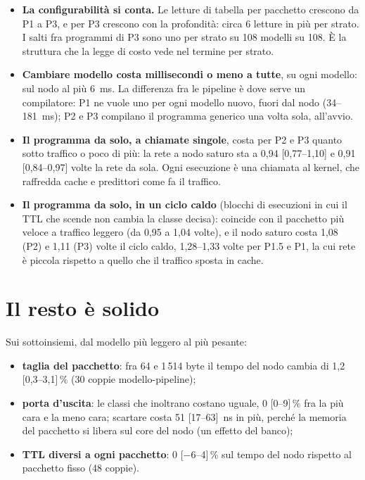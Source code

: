 \documentclass[11pt,a4paper,oneside]{report}
\begin{document}
\begin{itemize}
  \item \textbf{La configurabilità si conta.} Le letture di tabella per pacchetto
        crescono da P1 a P3, e per P3 crescono con la profondità: circa 6 letture
        in più per strato. I salti fra programmi di P3 sono uno per strato su 108
        modelli su 108. È la struttura che la legge di costo vede nel termine per
        strato.
  \item \textbf{Cambiare modello costa millisecondi o meno a tutte}, su ogni
        modello: sul nodo al più 6~ms. La differenza fra le pipeline è dove serve
        un compilatore: P1 ne vuole uno per ogni modello nuovo, fuori dal nodo
        (34--181~ms); P2 e P3 compilano il programma generico una volta sola,
        all'avvio.
  \item \textbf{Il programma da solo, a chiamate singole}, costa per P2 e P3 quanto
        sotto traffico o poco di più: la rete a nodo saturo sta a 0,94 [0,77--1,10]
        e 0,91 [0,84--0,97] volte la rete da sola. Ogni esecuzione è una chiamata
        al kernel, che raffredda cache e predittori come fa il traffico.
  \item \textbf{Il programma da solo, in un ciclo caldo} (blocchi di esecuzioni
        in cui il TTL che scende non cambia la classe decisa): coincide con il
        pacchetto più veloce a traffico leggero (da 0,95 a 1,04 volte), e il nodo
        saturo costa 1,08 (P2) e 1,11 (P3) volte il ciclo caldo, 1,28--1,33 volte
        per P1.5 e P1, la cui rete è piccola rispetto a quello che il traffico
        sposta in cache.
\end{itemize}

\section{Il resto è solido}

Sui sottoinsiemi, dal modello più leggero al più pesante:
\begin{itemize}
  \item \textbf{taglia del pacchetto}: fra 64 e 1\,514 byte il tempo del nodo cambia
        di 1,2 [0,3--3,1]\,\% (30 coppie modello-pipeline);
  \item \textbf{porta d'uscita}: le classi che inoltrano costano uguale, 0 [0--9]\,\% fra
        la più cara e la meno cara; scartare costa 51 [17--63]~ns in più, perché
        la memoria del pacchetto si libera sul core del nodo (un effetto del banco);
  \item \textbf{TTL diversi a ogni pacchetto}: 0 [$-6$--4]\,\% sul tempo del nodo
        rispetto al pacchetto fisso (48 coppie).
\end{itemize}
\end{document}
